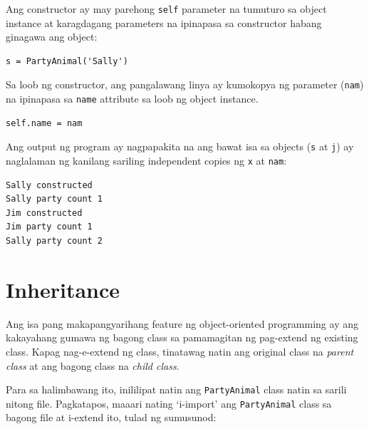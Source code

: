 \documentclass[10pt,]{book}
\begin{document}
Ang constructor ay may parehong \texttt{self} parameter na tumuturo sa
object instance at karagdagang parameters na ipinapasa sa constructor
habang ginagawa ang object:

{\small
\begin{verbatim}
s = PartyAnimal('Sally')
\end{verbatim}
}

Sa loob ng constructor, ang pangalawang linya ay kumokopya ng parameter
(\texttt{nam}) na ipinapasa sa \texttt{name} attribute sa loob ng object
instance.

{\small
\begin{verbatim}
self.name = nam
\end{verbatim}
}

Ang output ng program ay nagpapakita na ang bawat isa sa objects
(\texttt{s} at \texttt{j}) ay naglalaman ng kanilang sariling
independent copies ng \texttt{x} at \texttt{nam}:

{\small
\begin{verbatim}
Sally constructed
Sally party count 1
Jim constructed
Jim party count 1
Sally party count 2
\end{verbatim}
}

\section{Inheritance}\label{inheritance}

 Ang isa pang makapangyarihang feature ng
object-oriented programming ay ang kakayahang gumawa ng bagong class sa
pamamagitan ng pag-extend ng existing class. Kapag nag-e-extend ng
class, tinatawag natin ang original class na \emph{parent class} at ang
bagong class na \emph{child class}.

Para sa halimbawang ito, inililipat natin ang \texttt{PartyAnimal} class
natin sa sarili nitong file. Pagkatapos, maaari nating `i-import' ang
\texttt{PartyAnimal} class sa bagong file at i-extend ito, tulad ng
sumusunod:
\end{document}
